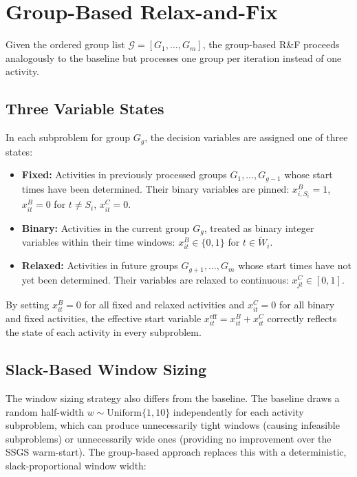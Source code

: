 \section{Group-Based Relax-and-Fix}
\label{sec:group_rf_decomp}
Given the ordered group list $\mathcal{G} = [G_1, \ldots, G_m]$,
the group-based R\&F proceeds analogously to the baseline but
processes one group per iteration instead of one activity.
\subsection{Three Variable States}
\label{subsec:three_states}
In each subproblem for group $G_g$, the decision variables are
assigned one of three states:
\begin{itemize}
    \item \textbf{Fixed:} Activities in previously processed groups
          $G_1, \ldots, G_{g-1}$ whose start times have been
          determined. Their binary variables are pinned:
          $x^B_{i, S_i} = 1$, $x^B_{it} = 0$ for $t \neq S_i$,
          $x^C_{it} = 0$.
    \item \textbf{Binary:} Activities in the current group $G_g$,
          treated as binary integer variables within their time
          windows: $x^B_{it} \in \{0,1\}$ for $t \in \widetilde{W}_i$.
    \item \textbf{Relaxed:} Activities in future groups
          $G_{g+1}, \ldots, G_m$ whose start times have not yet
          been determined. Their variables are relaxed to continuous:
          $x^C_{jt} \in [0,1]$.
\end{itemize}
By setting $x^B_{it} = 0$ for all fixed and relaxed activities
and $x^C_{it} = 0$ for all binary and fixed activities, the
effective start variable $x^{\mathrm{eff}}_{it} = x^B_{it} + x^C_{it}$
correctly reflects the state of each activity in every subproblem.
\subsection{Slack-Based Window Sizing}
\label{subsec:slack_window}
The window sizing strategy also differs from the baseline.
The baseline draws a random half-width
$w \sim \mathrm{Uniform}\{1, 10\}$ independently for each
activity subproblem, which can produce unnecessarily tight windows
(causing infeasible subproblems) or unnecessarily wide ones
(providing no improvement over the SSGS warm-start). The
group-based approach replaces this with a deterministic,
slack-proportional window width:

